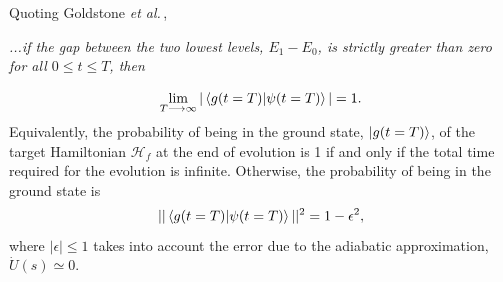 \newpage
Quoting Goldstone \textit{et al.}\,\cite{Farhi2000QuantumEvolution},
\begin{displayquote}
\textit{...if the gap between the two lowest levels, $E_{1} - E_{0}$, is strictly greater than zero for all $0 \leq t \leq T$, then}
\end{displayquote}
\begin{equation}
    \lim_{T\longrightarrow \infty} | \braket{g(t=T) | \psi(t=T)}| = 1.
\end{equation}
Equivalently, the probability of being in the ground state, $\ket{g(t=T)}$, of the target Hamiltonian $\mathcal{H}_{f}$ at the end of evolution is 1 if and only if the total time required for the evolution is infinite. Otherwise, the probability of being in the ground state is
\begin{equation}
    || \braket{g(t=T) | \psi(t=T)}||^{2} = 1 - \epsilon^{2},
\end{equation}
where $|\epsilon| \leq 1$ takes into account the error due to the adiabatic approximation, $\dot{U}(s) \simeq 0$.
